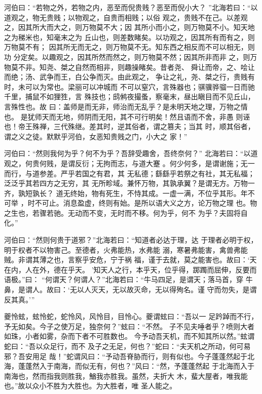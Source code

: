 \documentclass[a4paper,12pt,UTF8,twoside]{ctexbook}
\begin{document}
河伯曰：“若物之外，若物之内，恶至而倪贵贱？恶至而倪小大？ ”北海若曰：“以道观之，物无贵贱；以物观之，自贵而相贱；以俗 观之，贵贱不在己。以差观之，因其所大而大之，则万物莫不大；因 其所小而小之，则万物莫不小。知天地之为稊米也，知毫末之为 丘山也，则差数睹矣。以功观之，因其所有而有之，则万物莫不有； 因其所无而无之，则万物莫不无。知东西之相反而不可以相无，则功 分定矣。以趣观之，因其所然而然之，则万物莫不然；因其所非而非 之，则万物莫不非。知尧、桀之自然而相非，则趣操睹矣。昔者尧、 舜让而帝，之、哙让而绝；汤、武争而王，白公争而灭。由此观之， 争让之礼，尧、桀之行，贵贱有时，未可以为常也。梁丽可以冲城而 不可以窒穴，言殊器也；骐骥骅骝一日而驰千里，捕鼠不如狸狌，言 殊技也；鸱鸺夜撮蚤，察毫末，昼出瞋目而不见丘山，言殊性也。故 曰：盖师是而无非，师治而无乱乎？是未明天地之理，万物之情也。 是犹师天而无地，师阴而无阳，其不可行明矣！然且语而不舍，非愚 则诬也！帝王殊禅，三代殊继。差其时，逆其俗者，谓之篡夫；当其 时，顺其俗者，谓之义之徒。默默乎河伯，女恶知贵贱之门，小大之 家！”

河伯曰：“然则我何为乎？何不为乎？吾辞受趣舍，吾终奈何？” 北海若曰：“以道观之，何贵何贱，是谓反衍；无拘而志，与道大蹇 。何少何多，是谓谢施；无一而行，与道参差。严乎若国之有君，其 无私德；繇繇乎若祭之有社，其无私福；泛泛乎其若四方之无穷，其 无所畛域。兼怀万物，其孰承翼？是谓无方。万物一齐，孰短孰长？ 道无终始，物有死生，不恃其成。一虚一满，不位乎其形。年不可举 ，时不可止。消息盈虚，终则有始。是所以语大义之方，论万物之理 也。物之生也，若骤若驰。无动而不变，无时而不移。何为乎，何不 为乎？夫固将自化。”

河伯曰：“然则何贵于道邪？”北海若曰：“知道者必达于理，达 于理者必明于权，明于权者不以物害己。至德者，火弗能热，水弗能 溺，寒暑弗能害，禽兽弗能贼。非谓其薄之也，言察乎安危，宁于祸 福，谨于去就，莫之能害也。故曰：‘天在内，人在外，德在乎天。 ’知天人之行，本乎天，位乎得，踯躅而屈伸，反要而语极。”曰： “何谓天？何谓人？”北海若曰：“牛马四足，是谓天；落马首，穿 牛鼻，是谓人。故曰：‘无以人灭天，无以故灭命，无以得殉名。谨 守而勿失，是谓反其真。’”

夔怜蚿，蚿怜蛇，蛇怜风，风怜目，目怜心。夔谓蚿曰：“吾以一 足趻踔而不行，予无如矣。今子之使万足，独奈何？”蚿曰：“不然。 子不见夫唾者乎？喷则大者如珠，小者如雾，杂而下者不可胜数也。 今予动吾天机，而不知其所以然。”蚿谓蛇曰：“吾以众足行，而不 及子之无足，何也？”蛇曰：“夫天机之所动，何可易邪？吾安用足 哉！”蛇谓风曰：“予动吾脊胁而行，则有似也。今子蓬蓬然起于北 海，蓬蓬然入于南海，而似无有，何也？”风曰：“然，予蓬蓬然起 于北海而入于南海也，然而指我则胜我，鰌我亦胜我。虽然，夫折大 木，蜚大屋者，唯我能也。”故以众小不胜为大胜也。为大胜者，唯 圣人能之。
\end{document}
